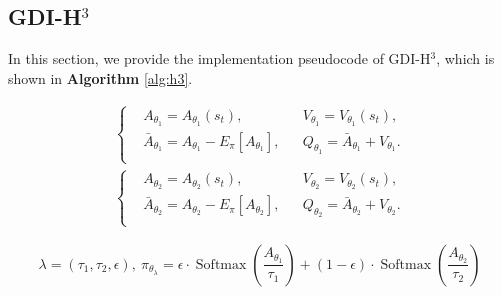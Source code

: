 \clearpage
\subsection{GDI-H$^3$}
In this section, we provide the implementation pseudocode of GDI-H$^3$, which is shown in \textbf{Algorithm} \ref{alg:h3}.

\begin{equation}
\label{Equ: h3 casa equ}
    \begin{aligned}
    \left\{
    \begin{aligned}
        &A_{\theta_1}=A_{\theta_1}\left(s_{t}\right),& 
        &V_{\theta_1}=V_{\theta_1}\left(s_{t}\right), \\
        &\bar{A}_{\theta_1}=A_{\theta_1}-E_{\pi}[A_{\theta_1}],& 
        &Q_{\theta_1}=\bar{A}_{\theta_1}+V_{\theta_1}. \\
    \end{aligned}
    \right.\\
    \left\{
    \begin{aligned}
        &A_{\theta_2}=A_{\theta_2}\left(s_{t}\right),& 
        &V_{\theta_2}=V_{\theta_2}\left(s_{t}\right), \\
        &\bar{A}_{\theta_2}=A_{\theta_2}-E_{\pi}[A_{\theta_2}],& 
        &Q_{\theta_2}=\bar{A}_{\theta_2}+V_{\theta_2}. \\
    \end{aligned}
    \right.
    \end{aligned}
\end{equation}

\begin{equation}
\label{Equ: h3 soft entropy}
    \lambda = (\tau_1, \tau_2, \epsilon), \ 
    \pi_{\theta_{\lambda}}=\epsilon \cdot \operatorname{Softmax}\left(\frac{A_{\theta_1}}{\tau_{1}}\right)+(1-\epsilon) \cdot \operatorname{Softmax}\left(\frac{A_{\theta_2}}{\tau_{2}}\right)
\end{equation}



